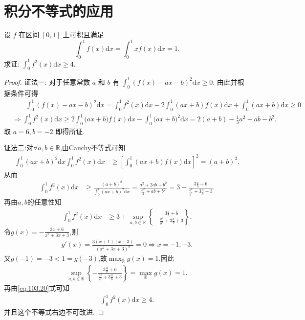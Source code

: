 \documentclass[../../main.tex]{subfiles}%
\begin{document}
\section{积分不等式的应用}

\begin{example}
设 $f$ 在区间 $[0,1]$ 上可积且满足
$$\int_0^1 f(x)\mathrm{d}x=\int_0^1 xf(x)\mathrm{d}x=1.$$
求证: $\int_0^1 f^2(x)\mathrm{d}x\geqslant 4$.
\end{example}
\begin{proof}

{\color{blue}证法一:}
对于任意常数 $a$ 和 $b$ 有 $\int_0^1 (f(x)-ax-b)^2\mathrm{d}x\geqslant 0$. 由此并根据条件可得
$$
\begin{aligned}
&\quad \quad \int_0^1{\left( f\left( x \right) -ax-b \right) ^2\mathrm{d}x}=\int_0^1{f^2\left( x \right) \mathrm{d}x}-2\int_0^1{\left( ax+b \right) f\left( x \right) \mathrm{d}x}+\int_0^1{\left( ax+b \right) \mathrm{d}x}\geqslant 0
\\
&\Longrightarrow \int_0^1{f^2\left( x \right) \mathrm{d}x}\geqslant 2\int_0^1{(ax}+b)f\left( x \right) \mathrm{d}x-\int_0^1{(ax}+b)^2\mathrm{d}x=2(a+b)-\frac{1}{3}a^2-ab-b^2.
\end{aligned}
$$
取 $a=6,b=-2$ 即得所证.

{\color{blue}证法二:}对$\forall a,b\in \mathbb{R}$,由Cauchy不等式可知
\begin{align*}
\int_0^1 (ax+b)^2\mathrm{d}x\int_0^1 f^2(x)\mathrm{d}x&\geqslant  \left[ \int_0^1 (ax+b)f(x)\mathrm{d}x \right]^2=(a+b)^2.
\end{align*}
从而
\begin{align*}
\int_0^1 f^2(x)\mathrm{d}x&\geqslant  \frac{(a+b)^2}{\int_0^1 (ax+b)^2\mathrm{d}x}=\frac{a^2+2ab+b^2}{\frac{a^2}{3}+ab+b^2}=3-\frac{3\frac{a}{b}+6}{\frac{a^2}{b^2}+3\frac{a}{b}+3}.
\end{align*}
再由$a,b$的任意性知
\begin{align}
\int_0^1 f^2(x)\mathrm{d}x&\geqslant  3+\sup_{a,b\in \mathbb{R}}\left\{ -\frac{3\frac{a}{b}+6}{\frac{a^2}{b^2}+3\frac{a}{b}+3} \right\}.\label{eq:103.20}
\end{align}
令$g(x)=-\frac{3x+6}{x^2+3x+3}$,则
\begin{align*}
g'(x)=\frac{3(x+1)(x+3)}{(x^2+3x+3)^2}=0\Rightarrow x=-1,-3.
\end{align*}
又$g(-1)=-3<1=g(-3)$,故$\max_{\mathbb{R}}g(x)=1$.因此
\begin{align*}
\sup_{a,b\in \mathbb{R}}\left\{ -\frac{3\frac{a}{b}+6}{\frac{a^2}{b^2}+3\frac{a}{b}+3} \right\}=\max_{\mathbb{R}}g(x)=1.
\end{align*}
再由\eqref{eq:103.20}式可知
\begin{align*}
\int_0^1 f^2(x)\mathrm{d}x\geqslant  4.
\end{align*}
并且这个不等式右边不可改进.

\end{proof}
\end{document}
